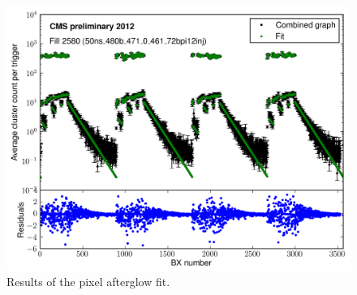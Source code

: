 \begin{figure}[H]
  \centering
  \includegraphics[width=0.5\columnwidth]{./afterglow.png}
  \caption{Results of the pixel afterglow fit.}
  \label{fig:LHC}
\end{figure}




